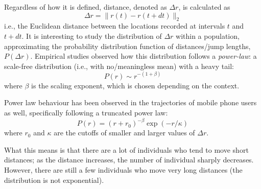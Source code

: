 Regardless of how it is defined, distance, denoted as $\Delta r$, is calculated as
\begin{equation*}
    \Delta r = \| r(t) - r(t + dt) \|_2
\end{equation*}
i.e., the Euclidean distance between the locations recorded at intervals $t$ and $t + dt$. It is interesting to study the distribution of $\Delta r$ within a population, approximating the probability distribution function of distances/jump lengths, $P(\Delta r)$. Empirical studies observed how this distribution follows a \textit{power-law}: a scale-free distribution (i.e., with no/meaningless mean) with a heavy tail:
\begin{equation*}
    P(r) \sim r^{-(1+\beta)}
\end{equation*}
where $\beta$ is the scaling exponent, which is chosen depending on the context.
\begin{figure}[H]
    \centering  
    
\end{figure}
Power law behaviour has been observed in the trajectories of mobile phone users as well, specifically following a truncated power law:
\begin{equation*}
    P(r) = (r + r_0)^{-\beta} \exp(-r/\kappa)
\end{equation*}
where $r_0$ and $\kappa$ are the cutoffs of smaller and larger values of $\Delta r$.

What this means is that there are a lot of individuals who tend to move short distances; as the distance increases, the number of individual sharply decreases. However, there are still a few individuals who move very long distances (the distribution is not exponential).

